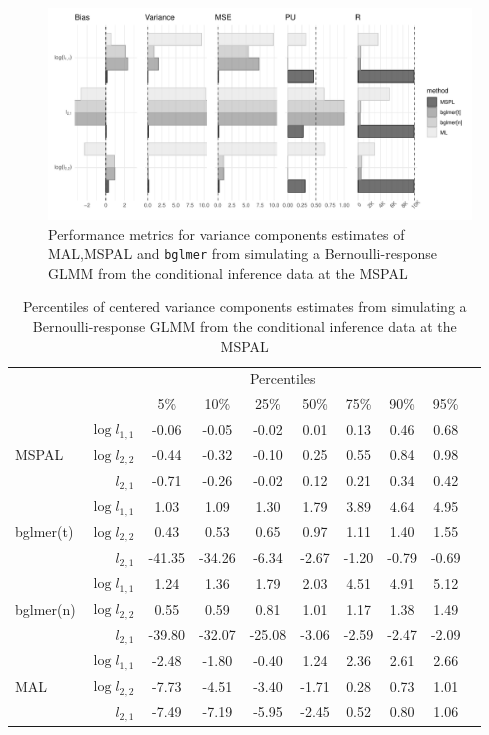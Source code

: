 \documentclass[11pt, a4paper]{article}
\theoremstyle{example} \newtheorem{example}{Example}[section]
\theoremstyle{theorem} \newtheorem{theorem}{Theorem}[section]
\begin{document}
\begin{figure}[H]
	\begin{center}
		\includegraphics[width=\textwidth]{Figures/cond_inf_simul.pdf}
	\end{center}
	\caption{Performance metrics for variance components estimates of MAL,MSPAL and \texttt{bglmer} from simulating a Bernoulli-response GLMM from the conditional inference data at the MSPAL}
	\label{fig:cond_inf_simul}
\end{figure}

\begin{table}[H]
	\centering
	\caption{Percentiles of centered variance components estimates from simulating a Bernoulli-response GLMM from the conditional inference data at the MSPAL} 
	\label{tab:sim2}
	\begin{tabular}{lrcccccccc}
		\toprule 
		&& \multicolumn{6}{c}{Percentiles} \\ \cmidrule{3-9}
		 &  & 5\% & 10\% & 25\% & 50\% & 75\% &90\% & 95\% \\  
		\cmidrule{3-9}
		& $\log l_{1,1}$ & -0.06 & -0.05 & -0.02 & 0.01 & 0.13 & 0.46 & 0.68 \\ 
		MSPAL & $\log l_{2,2}$ & -0.44 & -0.32 & -0.10 & 0.25 & 0.55 & 0.84 & 0.98 \\ 
		& $l_{2,1}$ & -0.71 & -0.26 & -0.02 & 0.12 & 0.21 & 0.34 & 0.42 \\ \cmidrule{3-9}
		& $\log l_{1,1}$ & 1.03 & 1.09 & 1.30 & 1.79 & 3.89 & 4.64 & 4.95 \\ 
		bglmer(t) & $\log l_{2,2}$ & 0.43 & 0.53 & 0.65 & 0.97 & 1.11 & 1.40 & 1.55 \\ 
		& $l_{2,1}$ & -41.35 & -34.26 & -6.34 & -2.67 & -1.20 & -0.79 & -0.69 \\ \cmidrule{3-9}
		& $\log l_{1,1}$ & 1.24 & 1.36 & 1.79 & 2.03 & 4.51 & 4.91 & 5.12 \\ 
		bglmer(n) & $\log l_{2,2}$ & 0.55 & 0.59 & 0.81 & 1.01 & 1.17 & 1.38 & 1.49 \\ 
		& $l_{2,1}$ & -39.80 & -32.07 & -25.08 & -3.06 & -2.59 & -2.47 & -2.09 \\ \cmidrule{3-9}
		& $\log l_{1,1}$ & -2.48 & -1.80 & -0.40 & 1.24 & 2.36 & 2.61 & 2.66 \\ 
		MAL & $\log l_{2,2}$ & -7.73 & -4.51 & -3.40 & -1.71 & 0.28 & 0.73 & 1.01 \\ 
		& $l_{2,1}$ & -7.49 & -7.19 & -5.95 & -2.45 & 0.52 & 0.80 & 1.06 \\ 
		\bottomrule
	\end{tabular}
\end{table}
\end{document}
